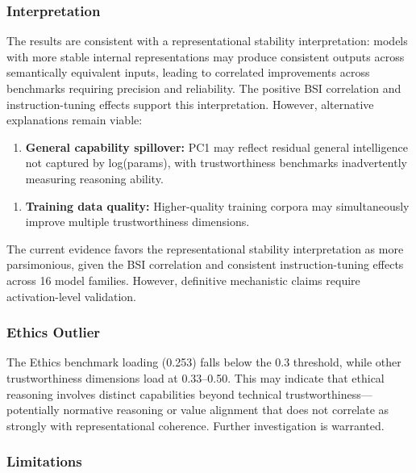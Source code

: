 
\subsubsection{Interpretation}

The results are consistent with a representational stability interpretation: models with more stable internal representations may produce consistent outputs across semantically equivalent inputs, leading to correlated improvements across benchmarks requiring precision and reliability. The positive BSI correlation and instruction-tuning effects support this interpretation. However, alternative explanations remain viable:

\begin{enumerate}
\item \textbf{General capability spillover:} PC1 may reflect residual general intelligence not captured by log(params), with trustworthiness benchmarks inadvertently measuring reasoning ability.
\end{enumerate}

\begin{enumerate}
\item \textbf{Training data quality:} Higher-quality training corpora may simultaneously improve multiple trustworthiness dimensions.
\end{enumerate}

The current evidence favors the representational stability interpretation as more parsimonious, given the BSI correlation and consistent instruction-tuning effects across 16 model families. However, definitive mechanistic claims require activation-level validation.

\subsubsection{Ethics Outlier}

The Ethics benchmark loading (0.253) falls below the 0.3 threshold, while other trustworthiness dimensions load at 0.33--0.50. This may indicate that ethical reasoning involves distinct capabilities beyond technical trustworthiness---potentially normative reasoning or value alignment that does not correlate as strongly with representational coherence. Further investigation is warranted.

\subsubsection{Limitations}


